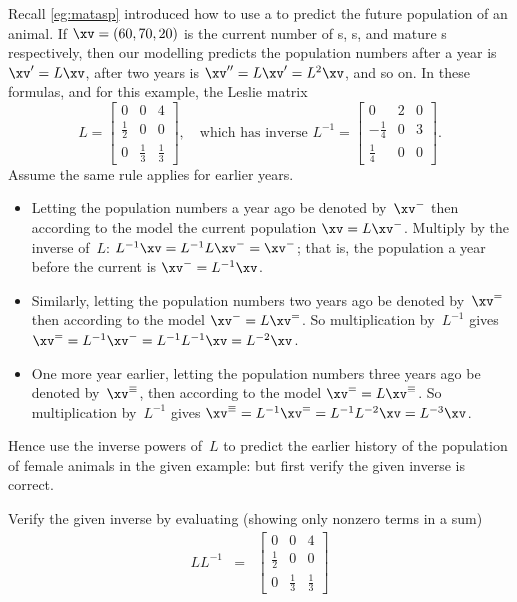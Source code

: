 \begin{example} \label{eg:invph}
Recall \cref{eg:matasp} introduced how to use a  to predict the future population of an animal.
If \(\xv=(60,70,20)\) is the current number of s, s, and mature s respectively, then our modelling predicts the population numbers after a year is \(\xv'=L\xv\), after two years is \(\xv''=L\xv'=L^2\xv\), and so on.
In these formulas, and for this example, the Leslie matrix
\begin{equation*}
L=\begin{bmatrix} 0&0&4\\\frac12&0&0\\0&\frac13&\frac13 \end{bmatrix},
\quad\text{which has inverse }L^{-1}=\begin{bmatrix} 0&2&0\\-\frac14&0&3\\\frac14&0&0 \end{bmatrix}.
\end{equation*} 
Assume the same rule applies for earlier years.
\begin{itemize}
\item Letting the population numbers a year ago be denoted by~\(\xv^-\) then according to the model the current population \(\xv=L\xv^-\).
Multiply by the inverse of~\(L\): \(L^{-1}\xv=L^{-1}L\xv^-=\xv^-\); that is, the population a year before the current is \(\xv^-=L^{-1}\xv\).
\item Similarly, letting the population numbers two years ago be denoted by~\(\xv^=\) then according to the model \(\xv^-=L\xv^=\).
So multiplication by~\(L^{-1}\) gives \(\xv^==L^{-1}\xv^-=L^{-1}L^{-1}\xv=L^{-2}\xv\).
\item One more year earlier, letting the population numbers three years ago be denoted by~\(\xv^\equiv\), then according to the model \(\xv^==L\xv^\equiv\).
So multiplication by~\(L^{-1}\) gives \(\xv^\equiv=L^{-1}\xv^==L^{-1}L^{-2}\xv=L^{-3}\xv\).
\end{itemize}
Hence use the inverse powers of~\(L\) to predict the earlier history of the population of female animals in the given example: but first verify the given inverse is correct.
\begin{solution} 
Verify the given inverse by evaluating (showing only nonzero terms in a sum)
\begin{eqnarray*}
LL^{-1}&=&
\begin{bmatrix} 0&0&4\\\frac12&0&0\\0&\frac13&\frac13 \end{bmatrix}

\end{eqnarray*}
\end{solution}
\end{example}
